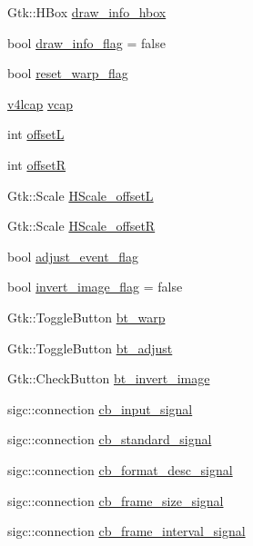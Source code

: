 \begin{DoxyCompactItemize}
\item 
Gtk\+::\+H\+Box \hyperlink{class_v_s_s_s___g_u_i_1_1_v4_l_interface_a12074ba62f181477daaafc7110edc661}{draw\+\_\+info\+\_\+hbox}
\item 
bool \hyperlink{class_v_s_s_s___g_u_i_1_1_v4_l_interface_acfa3f205af98a194432aca85f3e6efe9}{draw\+\_\+info\+\_\+flag} = false
\item 
bool \hyperlink{class_v_s_s_s___g_u_i_1_1_v4_l_interface_aa6cd5079d1f62050205bca10edf667ce}{reset\+\_\+warp\+\_\+flag}
\item 
\hyperlink{classv4lcap}{v4lcap} \hyperlink{class_v_s_s_s___g_u_i_1_1_v4_l_interface_a7ece61f4ccc6d5321c445e60f34e7f33}{vcap}
\item 
int \hyperlink{class_v_s_s_s___g_u_i_1_1_v4_l_interface_a4e43fc5295bdec46e8e2fd24bf719e0b}{offsetL}
\item 
int \hyperlink{class_v_s_s_s___g_u_i_1_1_v4_l_interface_a8bb9caa477b417f549198ea059375f06}{offsetR}
\item 
Gtk\+::\+Scale \hyperlink{class_v_s_s_s___g_u_i_1_1_v4_l_interface_a7261b87cb8ad1293c79003c48c99558a}{H\+Scale\+\_\+offsetL}
\item 
Gtk\+::\+Scale \hyperlink{class_v_s_s_s___g_u_i_1_1_v4_l_interface_a50fa202e4b9ec95b2c009a324aea10fb}{H\+Scale\+\_\+offsetR}
\item 
bool \hyperlink{class_v_s_s_s___g_u_i_1_1_v4_l_interface_a52efea2776e5a4c8af47ca2d43dd75a5}{adjust\+\_\+event\+\_\+flag}
\item 
bool \hyperlink{class_v_s_s_s___g_u_i_1_1_v4_l_interface_a5915fd3d7a8047e2c9cd331976acbbae}{invert\+\_\+image\+\_\+flag} = false
\item 
Gtk\+::\+Toggle\+Button \hyperlink{class_v_s_s_s___g_u_i_1_1_v4_l_interface_a6cdcc092c26848cd7009e56084ee1b23}{bt\+\_\+warp}
\item 
Gtk\+::\+Toggle\+Button \hyperlink{class_v_s_s_s___g_u_i_1_1_v4_l_interface_a0d17ffdc7f7792c2d37bcda12c700133}{bt\+\_\+adjust}
\item 
Gtk\+::\+Check\+Button \hyperlink{class_v_s_s_s___g_u_i_1_1_v4_l_interface_abf5daa6d389807d518f37573d99593b4}{bt\+\_\+invert\+\_\+image}
\item 
sigc\+::connection \hyperlink{class_v_s_s_s___g_u_i_1_1_v4_l_interface_a8c1c8e5183da12874fb0aa89c323a512}{cb\+\_\+input\+\_\+signal}
\item 
sigc\+::connection \hyperlink{class_v_s_s_s___g_u_i_1_1_v4_l_interface_a2ef0bde4e5eba4c9a1268de79963cbad}{cb\+\_\+standard\+\_\+signal}
\item 
sigc\+::connection \hyperlink{class_v_s_s_s___g_u_i_1_1_v4_l_interface_a01fe3a5a8d0f0bfa6bb19cdcb138b38d}{cb\+\_\+format\+\_\+desc\+\_\+signal}
\item 
sigc\+::connection \hyperlink{class_v_s_s_s___g_u_i_1_1_v4_l_interface_a1da538d681305543a819948f21eae6c2}{cb\+\_\+frame\+\_\+size\+\_\+signal}
\item 
sigc\+::connection \hyperlink{class_v_s_s_s___g_u_i_1_1_v4_l_interface_a4f91a6951069a2775009886057d2900d}{cb\+\_\+frame\+\_\+interval\+\_\+signal}
\end{DoxyCompactItemize}

